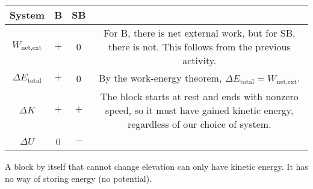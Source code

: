 \documentclass[]{article}
\begin{document}
\begin{TeacherMargin}
\begin{center}
	\Large
	\begin{tabular}{c|c|c|c}
		System & {\color{blue}B} & {\color{violet}SB} & \\ \hline
		$W_{\text{net,ext}}$ & {\color{blue}$+$} & {\color{violet}0} & \parbox{3cm}{\small For B, there is net external work, but for SB, there is not. This follows from the previous activity.} \\ \hline
		$\Delta E_{\text{total}}$ & {\color{blue}$+$} & {\color{violet}0} & \parbox{3cm}{\small By the work-energy theorem, $\Delta E_{\text{total}}=W_{\text{net,ext}}$.} \\ \hline
		$\Delta K$ & {\color{blue}$+$} & {\color{violet}$+$} & \parbox{3cm}{\small The block starts at rest and ends with nonzero speed, so it must have gained kinetic energy, regardless of our choice of system.} \\ \hline
		$\Delta U$ & {\color{blue}0} & {\color{violet}$-$} & 
	\end{tabular}
\end{center}
{\color{blue} A block by itself that cannot change elevation can only have kinetic energy. It has no way of storing energy (no potential).}

\end{TeacherMargin}
\end{document}
